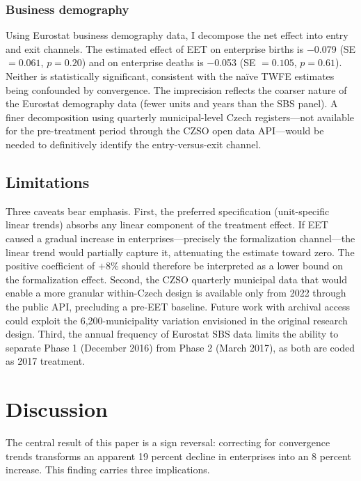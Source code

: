 \documentclass[12pt]{article}
\begin{document}
\subsubsection*{Business demography} Using Eurostat business demography data, I decompose the net effect into entry and exit channels. The estimated effect of EET on enterprise births is $-$0.079 (SE $= 0.061$, $p = 0.20$) and on enterprise deaths is $-$0.053 (SE $= 0.105$, $p = 0.61$). Neither is statistically significant, consistent with the na\"{i}ve TWFE estimates being confounded by convergence. The imprecision reflects the coarser nature of the Eurostat demography data (fewer units and years than the SBS panel). A finer decomposition using quarterly municipal-level Czech registers---not available for the pre-treatment period through the CZSO open data API---would be needed to definitively identify the entry-versus-exit channel.

\subsection{Limitations}

Three caveats bear emphasis. First, the preferred specification (unit-specific linear trends) absorbs any linear component of the treatment effect. If EET caused a gradual increase in enterprises---precisely the formalization channel---the linear trend would partially capture it, attenuating the estimate toward zero. The positive coefficient of $+$8\% should therefore be interpreted as a lower bound on the formalization effect. Second, the CZSO quarterly municipal data that would enable a more granular within-Czech design is available only from 2022 through the public API, precluding a pre-EET baseline. Future work with archival access could exploit the 6,200-municipality variation envisioned in the original research design. Third, the annual frequency of Eurostat SBS data limits the ability to separate Phase 1 (December 2016) from Phase 2 (March 2017), as both are coded as 2017 treatment.


\section{Discussion}

The central result of this paper is a sign reversal: correcting for convergence trends transforms an apparent 19 percent decline in enterprises into an 8 percent increase. This finding carries three implications.
\end{document}
